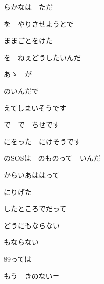 \documentclass[a4paper,tate,twocolumn,12pt]{ltjtarticle}
\begin{document}
\begin{flushleft}
\noindent\begin{minipage}{\linewidth}
らかなは　ただ

を　やりさせようとで

ままごとをけた

を　ねぇどうしたいんだ

あゝ　が
\end{minipage}

\vspace{2em}

\noindent\begin{minipage}{\linewidth}
のいんだで

えてしまいそうです

で　で　ちせです

にをった　にけそうです

のSOSは　のものって　いんだ
\end{minipage}

\vspace{2em}

\noindent\begin{minipage}{\linewidth}
からいあははって

にりげた

したところでだって

どうにもならない

もならない
\end{minipage}

\vspace{2em}

\noindent\begin{minipage}{\linewidth}
89っては

もう　きのない＝
\end{minipage}

\vspace{2em}


\end{flushleft}
\end{document}
